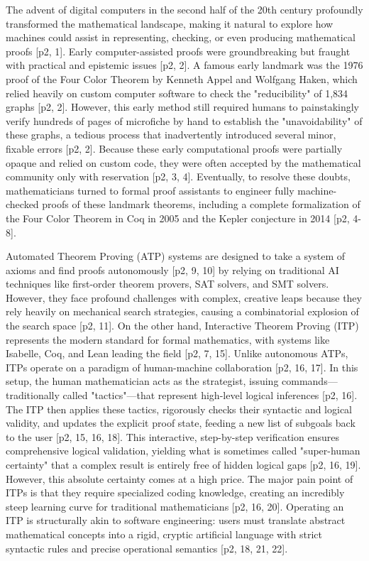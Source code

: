 The advent of digital computers in the second half of the 20th century profoundly transformed the mathematical landscape, making it natural to explore how machines could assist in representing, checking, or even producing mathematical proofs [p2, 1]. Early computer-assisted proofs were groundbreaking but fraught with practical and epistemic issues [p2, 2]. A famous early landmark was the 1976 proof of the Four Color Theorem by Kenneth Appel and Wolfgang Haken, which relied heavily on custom computer software to check the "reducibility" of 1,834 graphs [p2, 2]. However, this early method still required humans to painstakingly verify hundreds of pages of microfiche by hand to establish the "unavoidability" of these graphs, a tedious process that inadvertently introduced several minor, fixable errors [p2, 2]. Because these early computational proofs were partially opaque and relied on custom code, they were often accepted by the mathematical community only with reservation [p2, 3, 4]. Eventually, to resolve these doubts, mathematicians turned to formal proof assistants to engineer fully machine-checked proofs of these landmark theorems, including a complete formalization of the Four Color Theorem in Coq in 2005 and the Kepler conjecture in 2014 [p2, 4-8].

Automated Theorem Proving (ATP) systems are designed to take a system of axioms and find proofs autonomously [p2, 9, 10] by relying on traditional AI techniques like first-order theorem provers, SAT solvers, and SMT solvers. However, they face profound challenges with complex, creative leaps because they rely heavily on mechanical search strategies, causing a combinatorial explosion of the search space [p2, 11]. On the other hand, Interactive Theorem Proving (ITP) represents the modern standard for formal mathematics, with systems like Isabelle, Coq, and Lean leading the field [p2, 7, 15]. Unlike autonomous ATPs, ITPs operate on a paradigm of human-machine collaboration [p2, 16, 17]. In this setup, the human mathematician acts as the strategist, issuing commands—traditionally called "tactics"—that represent high-level logical inferences [p2, 16]. The ITP then applies these tactics, rigorously checks their syntactic and logical validity, and updates the explicit proof state, feeding a new list of subgoals back to the user [p2, 15, 16, 18]. This interactive, step-by-step verification ensures comprehensive logical validation, yielding what is sometimes called "super-human certainty" that a complex result is entirely free of hidden logical gaps [p2, 16, 19]. However, this absolute certainty comes at a high price. The major pain point of ITPs is that they require specialized coding knowledge, creating an incredibly steep learning curve for traditional mathematicians [p2, 16, 20]. Operating an ITP is structurally akin to software engineering: users must translate abstract mathematical concepts into a rigid, cryptic artificial language with strict syntactic rules and precise operational semantics [p2, 18, 21, 22].

